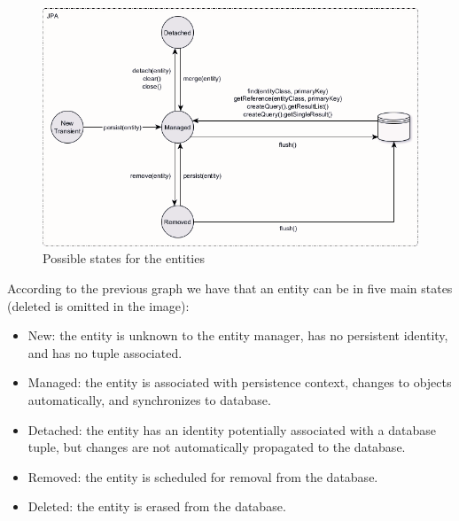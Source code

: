 \begin{figure}[H]
    \centering
    \includegraphics[width=0.75\linewidth]{images/jpaem.png}
    \caption{Possible states for the entities}
\end{figure}
According to the previous graph we have that an entity can be in five main states (deleted is omitted in the image): 
\begin{itemize}
    \item New: the entity is unknown to the entity manager, has no persistent identity, and has no tuple associated. 
    \item Managed: the entity is associated with persistence context, changes to objects automatically, and synchronizes to database. 
    \item Detached: the entity has an identity potentially associated with a database tuple, but changes are not automatically propagated to the database.
    \item Removed: the entity is scheduled for removal from the database.
    \item Deleted: the entity is erased from the database. 
\end{itemize}

